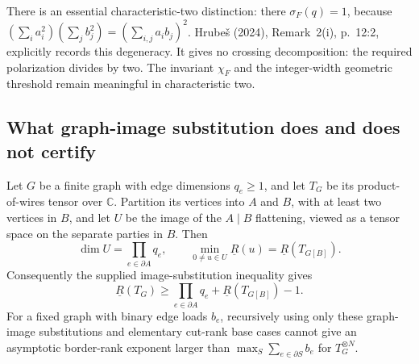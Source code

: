 There is an essential characteristic-two distinction: there
$\sigma_F(q)=1$, because
$(\sum_i a_i^2)(\sum_j b_j^2)=(\sum_{i,j}a_i b_j)^2$.
Hrube\v{s} (2024), Remark~2(i), p.~12:2, explicitly records this
degeneracy. It gives no crossing decomposition: the required
polarization divides by two. The invariant $\chi_F$ and the
integer-width geometric threshold remain meaningful in
characteristic two.

\subsection{What graph-image substitution does and does not certify}

\begin{proposition}
\label{rt:image}
Let $G$ be a finite graph with edge dimensions $q_e\geq1$, and let
$T_G$ be its product-of-wires tensor over $\mathbb C$. Partition its
vertices into $A$ and $B$, with at least two vertices in $B$, and let
$U$ be the image of the $A\mid B$ flattening, viewed as a tensor
space on the separate parties in $B$. Then
\[
 \dim U=\prod_{e\in\partial A}q_e,
 \qquad
 \min_{0\ne u\in U}\underline R(u)
       =\underline R(T_{G[B]}).
\]
Consequently the supplied image-substitution inequality gives
\[
 \underline R(T_G)\geq
       \prod_{e\in\partial A}q_e+
       \underline R(T_{G[B]})-1.
\]
For a fixed graph with binary edge loads $b_e$, recursively using
only these graph-image substitutions and elementary cut-rank base
cases cannot give an asymptotic border-rank exponent larger than
$\max_S\sum_{e\in\partial S}b_e$ for $T_G^{\otimes N}$.
\end{proposition}
